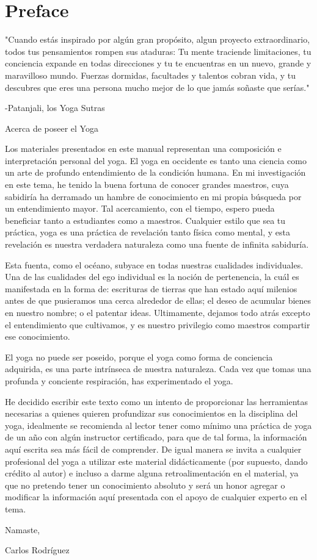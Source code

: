 \chapter{Preface}
"Cuando estás inspirado por algún gran propósito, algun proyecto extraordinario, todos tus pensamientos rompen sus ataduras: Tu mente traciende limitaciones, tu conciencia expande en todas direcciones y tu te encuentras en un nuevo, grande y maravilloso mundo. Fuerzas dormidas, facultades y talentos cobran vida, y tu descubres que eres una persona mucho mejor de lo que jamás soñaste que serías."

-Patanjali, los Yoga Sutras

\newpage
Acerca de poseer el Yoga

Los materiales presentados en este manual representan una composición e interpretación personal del yoga. El yoga en occidente es tanto una ciencia como un arte de profundo entendimiento de la condición humana. En mi investigación en este tema, he tenido la buena fortuna de conocer grandes maestros, cuya sabidiría ha derramado un hambre de conocimiento en mi propia búsqueda por un entendimiento mayor. Tal acercamiento, con el tiempo, espero pueda beneficiar tanto a estudiantes como a maestros. Cualquier estilo que sea tu práctica, yoga es una práctica de revelación tanto física como mental, y esta revelación es nuestra verdadera naturaleza como una fuente de infinita sabiduría.

Esta fuenta, como el océano, subyace en todas nuestras cualidades individuales. Una de las cualidades del ego individual es la noción de pertenencia, la cuál es manifestada en la forma de: escrituras de tierras que han estado aquí milenios antes de que pusieramos una cerca alrededor de ellas; el deseo de acumular bienes en nuestro nombre; o el patentar ideas. Ultimamente, dejamos todo atrás excepto el entendimiento que cultivamos, y es nuestro privilegio como maestros compartir ese conocimiento.

El yoga no puede ser poseido, porque el yoga como forma de conciencia adquirida, es una parte intrínseca de nuestra naturaleza. Cada vez que tomas una profunda y conciente respiración, has experimentado el yoga.

He decidido escribir este texto como un intento de proporcionar las herramientas necesarias a quienes quieren profundizar sus conocimientos en la disciplina del yoga, idealmente se recomienda al lector tener como mínimo una práctica de yoga de un año con algún instructor certificado, para que de tal forma, la información aquí escrita sea más fácil de comprender. De igual manera se invita a cualquier profesional del yoga a utilizar este material didácticamente (por supuesto, dando crédito al autor) e incluso a darme alguna retroalimentación en el material, ya que no pretendo tener un conocimiento absoluto y será un honor agregar o modificar la información aquí presentada con el apoyo de cualquier experto en el tema.

Namaste,

Carlos Rodríguez

\newpage
